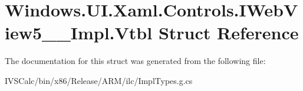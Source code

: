 \hypertarget{struct_windows_1_1_u_i_1_1_xaml_1_1_controls_1_1_i_web_view5_____impl_1_1_vtbl}{}\section{Windows.\+U\+I.\+Xaml.\+Controls.\+I\+Web\+View5\+\_\+\+\_\+\+Impl.\+Vtbl Struct Reference}
\label{struct_windows_1_1_u_i_1_1_xaml_1_1_controls_1_1_i_web_view5_____impl_1_1_vtbl}


The documentation for this struct was generated from the following file\+:\begin{DoxyCompactItemize}
\item 
I\+V\+S\+Calc/bin/x86/\+Release/\+A\+R\+M/ilc/Impl\+Types.\+g.\+cs\end{DoxyCompactItemize}
